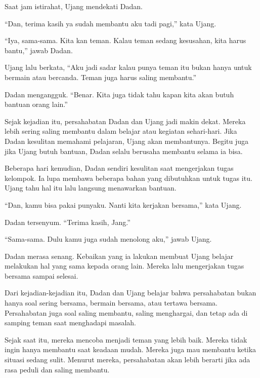 Saat jam istirahat, Ujang mendekati Dadan.

``Dan, terima kasih ya sudah membantu aku tadi pagi,'' kata Ujang.

``Iya, sama-sama. Kita kan teman. Kalau teman sedang kesusahan, kita harus bantu,'' jawab Dadan.

Ujang lalu berkata, ``Aku jadi sadar kalau punya teman itu bukan hanya untuk bermain atau bercanda. Teman juga harus saling membantu.''

Dadan mengangguk. ``Benar. Kita juga tidak tahu kapan kita akan butuh bantuan orang lain.''

Sejak kejadian itu, persahabatan Dadan dan Ujang jadi makin dekat. Mereka lebih sering saling membantu dalam belajar atau kegiatan sehari-hari. Jika Dadan kesulitan memahami pelajaran, Ujang akan membantunya. Begitu juga jika Ujang butuh bantuan, Dadan selalu berusaha membantu selama ia bisa.

Beberapa hari kemudian, Dadan sendiri kesulitan saat mengerjakan tugas kelompok. Ia lupa membawa beberapa bahan yang dibutuhkan untuk tugas itu. Ujang tahu hal itu lalu langsung menawarkan bantuan.

``Dan, kamu bisa pakai punyaku. Nanti kita kerjakan bersama,'' kata Ujang.

Dadan tersenyum. ``Terima kasih, Jang.''

``Sama-sama. Dulu kamu juga sudah menolong aku,'' jawab Ujang.

Dadan merasa senang. Kebaikan yang ia lakukan membuat Ujang belajar melakukan hal yang sama kepada orang lain. Mereka lalu mengerjakan tugas bersama sampai selesai.

Dari kejadian-kejadian itu, Dadan dan Ujang belajar bahwa persahabatan bukan hanya soal sering bersama, bermain bersama, atau tertawa bersama. Persahabatan juga soal saling membantu, saling menghargai, dan tetap ada di samping teman saat menghadapi masalah.

Sejak saat itu, mereka mencoba menjadi teman yang lebih baik. Mereka tidak ingin hanya membantu saat keadaan mudah. Mereka juga mau membantu ketika situasi sedang sulit. Menurut mereka, persahabatan akan lebih berarti jika ada rasa peduli dan saling membantu.

\jedahias
